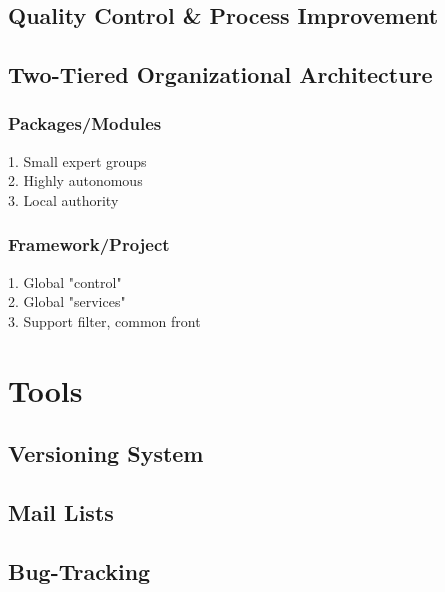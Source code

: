 \documentclass[12pt,relax]{article}
\begin{document}
\subsection{Quality Control \& Process Improvement}

\subsection{Two-Tiered Organizational Architecture}

  \subsubsection{Packages/Modules}
  1. Small expert groups\\
  2. Highly autonomous\\
  3. Local authority\\

  \subsubsection{Framework/Project}
  1. Global "control"\\
  2. Global "services"\\
  3. Support filter, common front\\

\clearpage


\section{Tools}
\label{Section:Tools}

\subsection{Versioning System}

\subsection{Mail Lists}

\subsection{Bug-Tracking}
\end{document}
